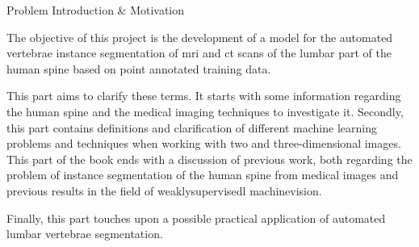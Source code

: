 \begin{partwithabstract}{Problem Introduction \& Motivation}
    \par{
        The objective of this project is the development of a model for the automated vertebrae instance segmentation of \acrshort{mri} and \acrshort{ct} scans of the lumbar part of the human spine based on point annotated training data.
    }
    \par{
        This part aims to clarify these terms. 
        It starts with some information regarding the human spine and the medical imaging techniques to investigate it.
        Secondly, this part contains definitions and clarification of different machine learning problems and techniques when working with two and three-dimensional images.
        This part of the book ends with a discussion of previous work, both regarding the problem of instance segmentation of the human spine from medical images and previous results in the field of \Gls{weaklysupervisedl} \Gls{machinevision}.
    }
    \par{
        Finally, this part touches upon a possible practical application of automated lumbar vertebrae segmentation.
    }
\end{partwithabstract}

\restoregeometry



